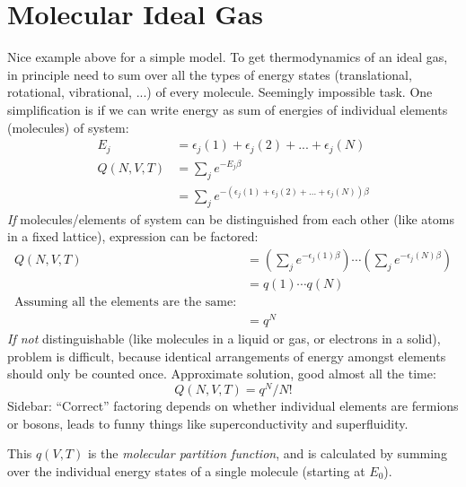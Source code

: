 \documentclass[11pt]{article}
\begin{document}
\section{Molecular Ideal Gas}
Nice example above for a simple model.  To get thermodynamics of an ideal gas,
in principle need to sum over all the types of energy states (translational,
rotational, vibrational, ...) of every molecule.  Seemingly impossible task.
One simplification is if we can write energy as sum of energies of individual
elements (molecules) of system:
    \begin{align}
      E_j&=\epsilon_j(1)+\epsilon_j(2) + ... + \epsilon_j(N) \\
      Q(N,V,T) &= \sum_j e^{-E_j\beta} \\
      &=\sum_je^{-(\epsilon_j(1)+\epsilon_j(2) + ... + \epsilon_j(N))\beta}
    \end{align}
{\em If} molecules/elements of system can be distinguished from each
        other (like atoms in a fixed lattice), expression can be factored:
      \begin{align}
        Q(N,V,T)&=\left ( \sum_j e^{-\epsilon_j(1)\beta}\right )\cdots \left ( \sum_j
          e^{-\epsilon_j(N)\beta}\right ) \\
      &= q(1)\cdots q(N) \\
      \text{Assuming all the elements are the same:}\\
      &= q^N
    \end{align}
{\em If not} distinguishable (like molecules in a liquid or gas, or
      electrons in a solid), problem is difficult, because identical
      arrangements of energy amongst elements should only be counted once.
      Approximate solution, good almost all the time:
    \begin{equation}
      Q(N,V,T)=q^N/N!
    \end{equation}
 Sidebar: ``Correct'' factoring depends on whether individual elements
      are fermions or bosons, leads to funny things like superconductivity and
      superfluidity.

This $q(V,T)$ is the {\em molecular partition function}, and is calculated by
summing over the individual energy states of a single molecule (starting at $E_0$).
\end{document}
